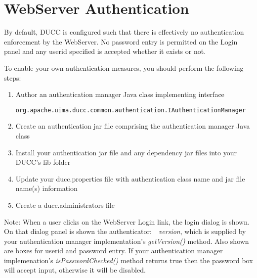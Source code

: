 \section{WebServer Authentication}
\label{sec:WebServer Authentication}

    By default, DUCC is configured such that there is effectively no
    authentication enforcement by the WebServer. No password entry is permitted
    on the Login panel and any userid specified is accepted whether it exists or
    not.
    
    To enable your own authentication measures, you should perform the following
    steps:
    
    \begin{enumerate}
      \item Author an authentication manager Java class implementing interface
      \begin{verbatim}
org.apache.uima.ducc.common.authentication.IAuthenticationManager\end{verbatim}
      \item Create an authentication jar file comprising the
      authentication manager Java class
      \item Install your authentication jar file and any dependency jar files
      into your DUCC's lib folder
      \item Update your ducc.properties file with authentication class name
      and jar file name(s) information
      \item Create a ducc.administrators file
    \end{enumerate}

    Note: When a user clicks on the WebServer Login link, the login dialog is
    shown. On that dialog panel is shown the \mbox{authenticator: {\em
    version}}, which is supplied by your authentication manager implementation's {\em
    \mbox{getVersion()}} method. Also shown are boxes for userid and password
    entry. If your authentication manager implemenation's {\em \mbox{isPasswordChecked()}}
    method returns true then the password box will accept input, otherwise it will be
    disabled.
    
